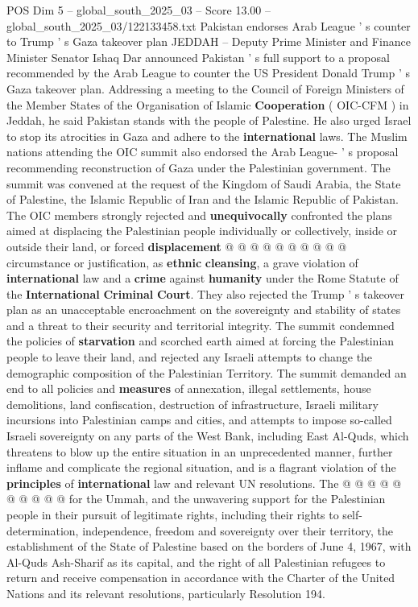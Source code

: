 \begin{textsample}{POS Dim 5 – global\_south\_2025\_03 – Score 13.00 – global\_south\_2025\_03/122133458.txt}  \label{ex:f5_pos_190}
Pakistan endorses Arab League ' s counter to Trump ' s Gaza takeover plan JEDDAH -- Deputy Prime Minister and Finance Minister Senator Ishaq Dar announced Pakistan ' s full support to a proposal recommended by the Arab League to counter the US President Donald Trump ' s Gaza takeover plan.
Addressing a meeting to the Council of Foreign Ministers of the Member States of the Organisation of Islamic \textbf{Cooperation} ( OIC-CFM ) in Jeddah, he said Pakistan stands with the people of Palestine.
He also urged Israel to stop its atrocities in Gaza and adhere to the \textbf{international} laws.
The Muslim nations attending the OIC summit also endorsed the Arab League- ' s proposal recommending reconstruction of Gaza under the Palestinian government.
The summit was convened at the request of the Kingdom of Saudi Arabia, the State of Palestine, the Islamic Republic of Iran and the Islamic Republic of Pakistan.
The OIC members strongly rejected and \textbf{unequivocally} confronted the plans aimed at displacing the Palestinian people individually or collectively, inside or outside their land, or forced \textbf{displacement} @ @ @ @ @ @ @ @ @ @ circumstance or justification, as \textbf{ethnic} \textbf{cleansing}, a grave violation of \textbf{international} law and a \textbf{crime} against \textbf{humanity} under the Rome Statute of the \textbf{International} \textbf{Criminal} \textbf{Court}.
They also rejected the Trump ' s takeover plan as an unacceptable encroachment on the sovereignty and stability of states and a threat to their security and territorial integrity.
The summit condemned the policies of \textbf{starvation} and scorched earth aimed at forcing the Palestinian people to leave their land, and rejected any Israeli attempts to change the demographic composition of the Palestinian Territory.
The summit demanded an end to all policies and \textbf{measures} of annexation, illegal settlements, house demolitions, land confiscation, destruction of infrastructure, Israeli military incursions into Palestinian camps and cities, and attempts to impose so-called Israeli sovereignty on any parts of the West Bank, including East Al-Quds, which threatens to blow up the entire situation in an unprecedented manner, further inflame and complicate the regional situation, and is a flagrant violation of the \textbf{principles} of \textbf{international} law and relevant UN resolutions.
The @ @ @ @ @ @ @ @ @ @ for the Ummah, and the unwavering support for the Palestinian people in their pursuit of legitimate rights, including their rights to self-determination, independence, freedom and sovereignty over their territory, the establishment of the State of Palestine based on the borders of June 4, 1967, with Al-Quds Ash-Sharif as its capital, and the right of all Palestinian refugees to return and receive compensation in accordance with the Charter of the United Nations and its relevant resolutions, particularly Resolution 194.

\end{textsample}

